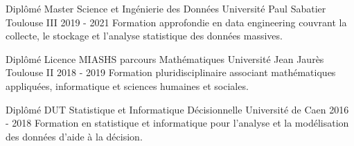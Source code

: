 


\begin{cventries}


\cventry
{Diplômé} %
{Master Science et Ingénierie des Données} %
{Université Paul Sabatier Toulouse III} %
{2019 - 2021} %
{Formation approfondie en data engineering couvrant la collecte, le stockage et l'analyse statistique des données massives.} %
\vspace{1em}


\cventry
{Diplômé} %
{Licence MIASHS parcours Mathématiques} %
{Université Jean Jaurès Toulouse II} %
{2018 - 2019} %
{Formation pluridisciplinaire associant mathématiques appliquées, informatique et sciences humaines et sociales.} %
\vspace{1em}


\cventry
{Diplômé} %
{DUT Statistique et Informatique Décisionnelle} %
{Université de Caen} %
{2016 - 2018} %
{Formation en statistique et informatique pour l'analyse et la modélisation des données d'aide à la décision.} %


\end{cventries}
